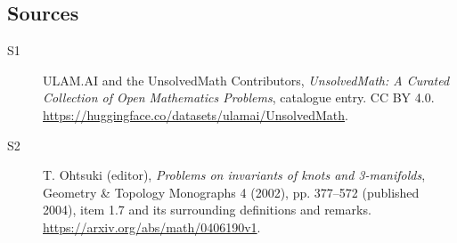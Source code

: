 \documentclass[11pt]{article}
\begin{document}
\subsection{Sources}
\begin{description}
\item[\hypertarget{source:statement:1}{S1}] ULAM.AI and the UnsolvedMath Contributors, \emph{UnsolvedMath: A Curated Collection of Open Mathematics Problems}, catalogue entry. CC BY 4.0. \url{https://huggingface.co/datasets/ulamai/UnsolvedMath}.
\item[\hypertarget{source:statement:2}{S2}] T. Ohtsuki (editor), \emph{Problems on invariants of knots and 3-manifolds}, Geometry \& Topology Monographs 4 (2002), pp. 377--572 (published 2004), item 1.7 and its surrounding definitions and remarks. \url{https://arxiv.org/abs/math/0406190v1}.
\end{description}
\label{end:statement}
\end{document}
